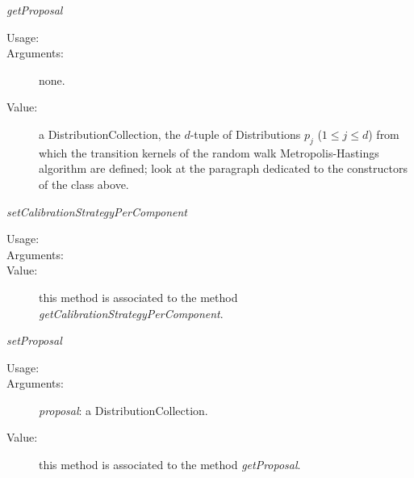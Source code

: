 \begin{description}
\begin{description}
\item \textit{getProposal}
\begin{description}
\item[Usage:] \rule{0pt}{1em}
\item[Arguments:] none. \rule{0pt}{1em}
\item[Value:] a DistributionCollection, the $d$-tuple of Distributions $p_j$
($1\leq{}j\leq{}d$) from which the transition kernels of the random walk
Metropolis-Hastings algorithm are defined; look at the paragraph dedicated to
the constructors of the class above.
\end{description}
\bigskip

\item \textit{setCalibrationStrategyPerComponent}
\begin{description}
\item[Usage:] \rule{0pt}{1em}
\item[Arguments:] \rule{0pt}{1em}
\item[Value:] this method is associated to the method
\textit{getCalibrationStrategyPerComponent}.
\end{description}
\bigskip

\item \textit{setProposal}
\begin{description}
\item[Usage:] \rule{0pt}{1em}
\item[Arguments:] \textit{proposal}: a DistributionCollection. \rule{0pt}{1em}
\item[Value:] this method is associated to the method \textit{getProposal}.
\end{description}

\end{description}

\end{description}


